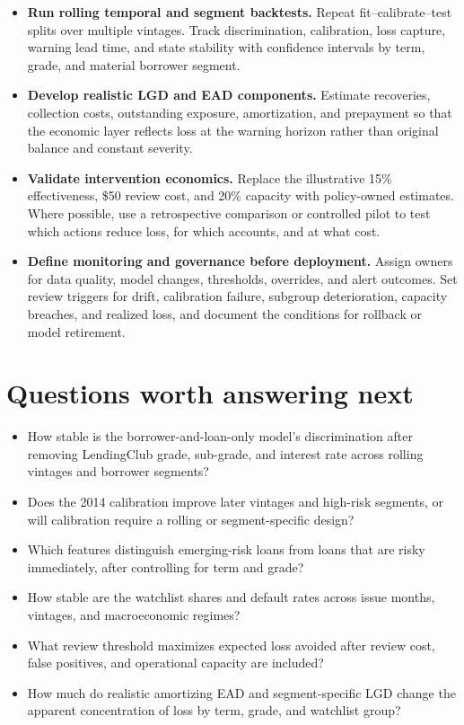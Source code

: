 \documentclass[11pt]{article}
\begin{document}
\begin{itemize}[label=$\square$,leftmargin=2em]
  \item \textbf{Run rolling temporal and segment backtests.} Repeat
  fit--calibrate--test splits over multiple vintages. Track discrimination,
  calibration, loss capture, warning lead time, and state stability with confidence
  intervals by term, grade, and material borrower segment.

  \item \textbf{Develop realistic LGD and EAD components.} Estimate recoveries,
  collection costs, outstanding exposure, amortization, and prepayment so that the
  economic layer reflects loss at the warning horizon rather than original balance
  and constant severity.

  \item \textbf{Validate intervention economics.} Replace the illustrative 15\%
  effectiveness, \$50 review cost, and 20\% capacity with policy-owned estimates.
  Where possible, use a retrospective comparison or controlled pilot to test which
  actions reduce loss, for which accounts, and at what cost.

  \item \textbf{Define monitoring and governance before deployment.} Assign owners
  for data quality, model changes, thresholds, overrides, and alert outcomes. Set
  review triggers for drift, calibration failure, subgroup deterioration, capacity
  breaches, and realized loss, and document the conditions for rollback or model
  retirement.
\end{itemize}

\section{Questions worth answering next}

\begin{itemize}
  \item How stable is the borrower-and-loan-only model's discrimination after
  removing LendingClub grade, sub-grade, and interest rate across rolling
  vintages and borrower segments?
  \item Does the 2014 calibration improve later vintages and high-risk segments,
  or will calibration require a rolling or segment-specific design?
  \item Which features distinguish emerging-risk loans from loans that are risky
  immediately, after controlling for term and grade?
  \item How stable are the watchlist shares and default rates across issue months,
  vintages, and macroeconomic regimes?
  \item What review threshold maximizes expected loss avoided after review cost,
  false positives, and operational capacity are included?
  \item How much do realistic amortizing EAD and segment-specific LGD change the
  apparent concentration of loss by term, grade, and watchlist group?
\end{itemize}
\end{document}
